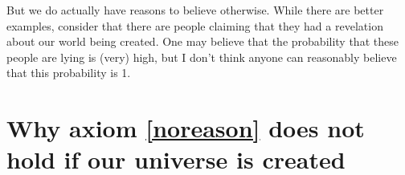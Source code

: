 \documentclass[a4paper
,draft
]{article}
\begin{document}
But we do actually have reasons to believe otherwise. While there are better examples, consider that there are people claiming that they had a revelation about our world being created. One may believe that the probability that these people are lying is (very) high, but I don't think anyone can reasonably believe that this probability is 1.

\section{Why axiom \ref{noreason} does not hold if our universe is created}
\end{document}
